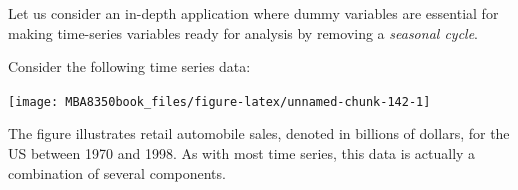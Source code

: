 \documentclass[
]{book}
\newenvironment{Shaded}{\begin{snugshade}}{\end{snugshade}}
\newcommand{\AttributeTok}[1]{\textcolor[rgb]{0.77,0.63,0.00}{#1}}
\newcommand{\ConstantTok}[1]{\textcolor[rgb]{0.00,0.00,0.00}{#1}}
\newcommand{\DecValTok}[1]{\textcolor[rgb]{0.00,0.00,0.81}{#1}}
\newcommand{\FunctionTok}[1]{\textcolor[rgb]{0.00,0.00,0.00}{#1}}
\newcommand{\NormalTok}[1]{#1}
\newcommand{\OtherTok}[1]{\textcolor[rgb]{0.56,0.35,0.01}{#1}}
\newcommand{\SpecialCharTok}[1]{\textcolor[rgb]{0.00,0.00,0.00}{#1}}
\newcommand{\StringTok}[1]{\textcolor[rgb]{0.31,0.60,0.02}{#1}}
\begin{document}
Let us consider an in-depth application where dummy variables are essential for making time-series variables ready for analysis by removing a \emph{seasonal cycle}.

Consider the following time series data:

\begin{Shaded}
\end{Shaded}

\begin{center}\texttt{[image: MBA8350book\_files/figure-latex/unnamed-chunk-142-1]} \end{center}

The figure illustrates retail automobile sales, denoted in billions of dollars, for the US between 1970 and 1998. As with most time series, this data is actually a combination of several components.
\end{document}
